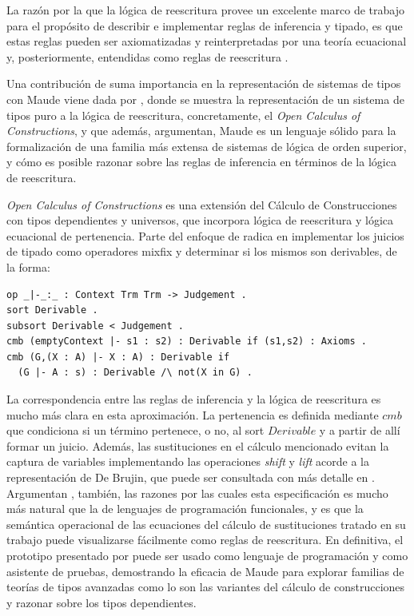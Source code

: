 La razón por la que la lógica de reescritura provee un excelente marco de trabajo para el propósito de describir e implementar reglas de inferencia y tipado, es que estas reglas pueden ser axiomatizadas y reinterpretadas por una teoría ecuacional y, posteriormente, entendidas como reglas de reescritura \citep{clavel2007}.

Una contribución de suma importancia en la representación de sistemas de tipos con Maude viene dada por \cite{stehr}, donde se muestra la representación de un sistema de tipos puro a la lógica de reescritura, concretamente, el \textit{Open Calculus of Constructions}, y que además, argumentan, Maude es un lenguaje sólido para la formalización de una familia más extensa de sistemas de lógica de orden superior, y cómo es posible razonar sobre las reglas de inferencia en términos de la lógica de reescritura.

\textit{Open Calculus of Constructions} es una extensión del Cálculo de Construcciones con tipos dependientes y universos, que incorpora lógica de reescritura y lógica ecuacional de pertenencia. Parte del enfoque de \cite{stehr} radica en implementar los juicios de tipado como operadores mixfix y determinar si los mismos son derivables, de la forma:

\begin{lstlisting}
op _|-_:_ : Context Trm Trm -> Judgement .
sort Derivable .
subsort Derivable < Judgement .
cmb (emptyContext |- s1 : s2) : Derivable if (s1,s2) : Axioms .
cmb (G,(X : A) |- X : A) : Derivable if
  (G |- A : s) : Derivable /\ not(X in G) .
\end{lstlisting}

La correspondencia entre las reglas de inferencia y la lógica de reescritura es mucho más clara en esta aproximación. La pertenencia es definida mediante $cmb$ que condiciona si un término pertenece, o no, al sort $Derivable$ y a partir de allí formar un juicio. Además, las sustituciones en el cálculo mencionado evitan la captura de variables implementando las operaciones \textit{shift} y \textit{lift} acorde a la representación de De Brujin, que puede ser consultada con más detalle en \cite{pierce2002}.
Argumentan \cite{stehr}, también, las razones por las cuales esta especificación es mucho más natural que la de lenguajes de programación funcionales, y es que la semántica operacional de las ecuaciones del cálculo de sustituciones tratado en su trabajo puede visualizarse fácilmente como reglas de reescritura. En definitiva, el prototipo presentado por \cite{stehr} puede ser usado como lenguaje de programación y como asistente de pruebas, demostrando la eficacia de Maude para explorar familias de teorías de tipos avanzadas como lo son las variantes del cálculo de construcciones y razonar sobre los tipos dependientes.

